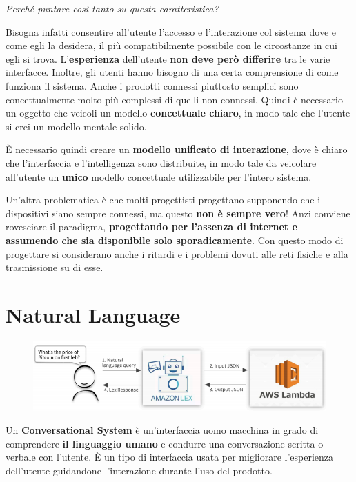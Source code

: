 \documentclass[a4paper,11pt,oneside]{book}
\begin{document}
\begin{flushleft}
	\textit{Perché puntare così tanto su
		questa caratteristica?}
\end{flushleft}

Bisogna infatti consentire all'utente l'accesso e l'interazione col sistema dove e come egli la desidera, il più compatibilmente possibile con le circostanze in cui egli si trova. L'\textbf{esperienza} dell'utente \textbf{non deve però differire} tra le varie interfacce. Inoltre, gli utenti hanno bisogno di una certa comprensione di come funziona il sistema. Anche i prodotti connessi piuttosto semplici sono concettualmente molto più complessi di quelli non connessi. Quindi è necessario un oggetto che veicoli un modello \textbf{concettuale chiaro}, in modo tale che l'utente si crei un modello mentale solido.

È necessario quindi creare un
\textbf{modello unificato di interazione}, dove è chiaro che l'interfaccia e l'intelligenza sono distribuite, in modo tale da veicolare all'utente un \textbf{unico} modello concettuale utilizzabile per l'intero sistema.

Un'altra problematica è che molti progettisti progettano supponendo che i dispositivi siano sempre connessi, ma questo \textbf{non è sempre vero}! Anzi conviene rovesciare il paradigma, \textbf{progettando per l'assenza di internet e assumendo che sia disponibile solo sporadicamente}. Con questo modo di progettare si considerano anche i ritardi e i problemi dovuti alle reti fisiche e alla trasmissione su di esse.

\chapter{Natural Language}

\begin{figure}[!h]
	\includegraphics[scale=0.5]{immagini/Natural_language.png}
\end{figure}

Un \textbf{Conversational System} è un'interfaccia uomo macchina in grado di comprendere \textbf{il linguaggio umano} e condurre una conversazione scritta o verbale con l'utente. È un tipo di interfaccia usata per migliorare l'esperienza dell'utente guidandone l'interazione durante l'uso del prodotto.
\end{document}
